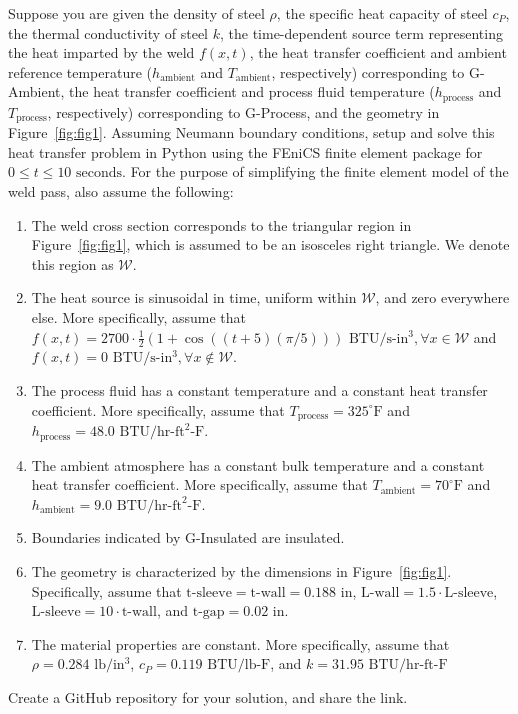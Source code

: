 \begin{quotationb}
\noindent Suppose you are given the density of steel $\rho$, the specific heat capacity of steel $c_{P}$, the thermal conductivity of steel $k$, the time-dependent source term representing the heat imparted by the weld $f(x,t)$, the heat transfer coefficient and ambient reference temperature ($h_{\textrm{ambient}}$ and $T_{\textrm{ambient}}$, respectively) corresponding to G-Ambient, the heat transfer coefficient and process fluid temperature ($h_{\textrm{process}}$ and $T_{\textrm{process}}$, respectively) corresponding to G-Process, and the geometry in Figure~\ref{fig:fig1}. Assuming Neumann boundary conditions, setup and solve this heat transfer problem in Python using the FEniCS finite element package for $0 \leq t \leq 10 \textrm{ seconds}$. For the purpose of simplifying the finite element model of the weld pass, also assume the following:
\begin{enumerate}[1)]
\item The weld cross section corresponds to the triangular region in Figure~\ref{fig:fig1}, which is assumed to be an isosceles right triangle. We denote this region as $\mathcal{W}$.
\item The heat source is sinusoidal in time, uniform within $\mathcal{W}$, and zero everywhere else. More specifically, assume that $f(x,t) = 2700 \cdot \frac{1}{2}\left(1 + \cos((t+5)(\pi / 5)) \right) \textrm{ BTU} / \textrm{s-}\textrm{in}^3, \forall x \in \mathcal{W}$ and $f(x,t) = 0 \textrm{ BTU} / \textrm{s-}\textrm{in}^3, \forall x \notin \mathcal{W}$. 
\item The process fluid has a constant temperature and a constant heat transfer coefficient. More specifically, assume that $T_{\textrm{process}} = 325 ^\circ \textrm{F}$ and $h_{\textrm{process}} = 48.0 \textrm{ BTU}/\textrm{hr-ft}^2\textrm{-F}$.
\item The ambient atmosphere has a constant bulk temperature and a constant heat transfer coefficient. More specifically, assume that $T_{\textrm{ambient}} = 70 ^\circ \textrm{F}$ and $h_{\textrm{ambient}} = 9.0 \textrm{ BTU}/\textrm{hr-ft}^2\textrm{-F}$.
\item Boundaries indicated by G-Insulated are insulated.
\item The geometry is characterized by the dimensions in Figure~\ref{fig:fig1}. Specifically, assume that $\textrm{t-sleeve} = \textrm{t-wall} = 0.188 \textrm{ in}$, $\textrm{L-wall} = 1.5 \cdot \textrm{L-sleeve}$, $\textrm{L-sleeve} = 10 \cdot \textrm{t-wall}$, and $\textrm{t-gap} = 0.02 \textrm{ in}$. 
\item The material properties are constant. More specifically, assume that $\rho = 0.284 \textrm{ lb} / \textrm{in}^3$, $c_{P} = 0.119 \textrm{ BTU} / \textrm{lb-F}$, and $k = 31.95 \textrm{ BTU} / \textrm{hr-ft-F}$ \\
\end{enumerate}

\noindent Create a GitHub repository for your solution, and share the link.
\end{quotationb}

